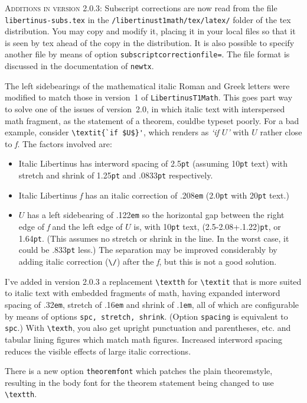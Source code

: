 \documentclass{article}
\begin{document}
\textsc{Additions in version 2.0.3:}
Subscript corrections are now read from the file {\tt libertinus-subs.tex} in the \verb|/libertinust1math/tex/latex/| folder of the tex distribution. You may copy and modify it, placing it in your local files so that it is seen by tex ahead of the copy in the distribution. It is also possible to specify another file by means of option {\tt subscriptcorrectionfile=}. The file format is discussed in the documentation of {\tt newtx}.

The left sidebearings of the mathematical italic Roman and Greek letters were modified to match those in  version~1 of {\tt LibertinusT1Math}. This goes part way to solve one of the issues of version~2.0, in which italic text with interspersed math fragment, as the statement of a theorem, couldbe typeset poorly. For a bad example, consider   \verb|\textit{`if $U$}'|, which renders as \textit{`if $U$'} with $U$ rather close to \textit{f}. The factors involved are:
\begin{itemize}
\item Italic Libertinus has interword spacing of 2.5{\tt pt} (assuming 10{\tt pt} text) with stretch and shrink of 1.25{\tt pt} and .0833{\tt pt} respectively.
\item Italic Libertinus \textit{f} has an italic correction of .208{\tt em} (2.0{\tt pt} with 20{\tt pt} text.)
\item $U$ has a left sidebearing of .122{\tt em} so the horizontal gap between the right edge of \textit{f} and the left edge of $U$ is, with 10{\tt pt} text, (2.5-2.08+.1.22){\tt pt}, or 1.64{\tt pt}. (This assumes no stretch or shrink in the line. In the worst case, it could be .833{\tt pt} less.) The separation may be improved considerably by adding italic correction (\verb|\/|) after the \textit{f}, but this is not a good solution.
\end{itemize}
I've added in version 2.0.3 a replacement \verb|\textth| for \verb|\textit| that is more suited to italic text with embedded fragments of math, having expanded interword spacing of .32{\tt em}, stretch of .16{\tt em} and shrink of .1{\tt em}, all of which are configurable by means of options {\tt spc, stretch, shrink}. (Option {\tt spacing} is equivalent to {\tt spc}.) With \verb|\texth|, you also get upright punctuation and parentheses, etc. and tabular lining figures which  match math figures. Increased interword spacing reduces the visible effects of large italic corrections.
 
There is a new option {\tt theoremfont} which patches the 
plain theoremstyle, resulting in the body font for the theorem statement being changed to use \verb|\textth|.
\end{document}
